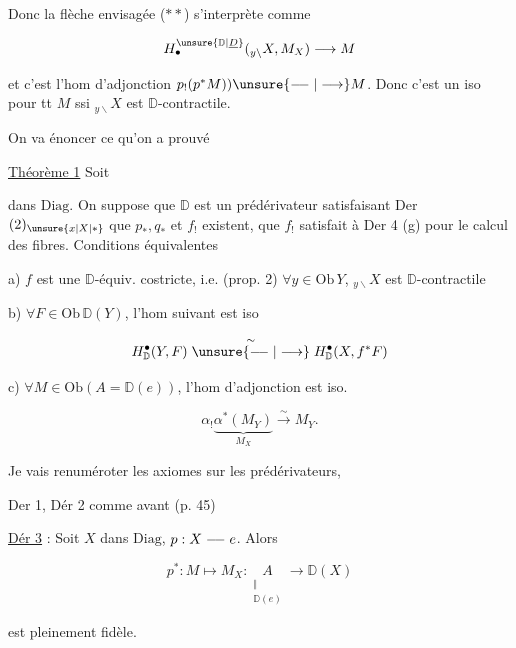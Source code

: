 
Donc la flèche envisagée ($**$) s'interprète comme

\[ H_\bullet^{\unsure{\mathbb D|\underline D}}({}_{y\backslash}X,M_X)\longrightarrow M \]

et c'est l'hom d'adjonction $p_!(p^*M))\unsure{\relbar\joinrel\relbar|\longrightarrow}M$. Donc c'est un iso pour tt $M$ ssi $ {}_{y\backslash}X$ est  $\mathbb D$-contractile.

On va  énoncer ce qu'on a prouvé

\uline{Théorème 1} Soit


dans $\mathrm{Diag}$. On suppose que $\mathbb D$ est un  prédérivateur satisfaisant Der $(2)_{\unsure{x|X|*}}$  que  $p_*,q_*$ et $f_!$ existent, que $f_!$ satisfait à Der 4 (g) pour le calcul des fibres. Conditions équivalentes

a) $f$ est une $\mathbb D$-équiv. costricte, i.e. (prop. 2) $\forall y\in\mathrm{Ob}\,Y$, $ {}_{y\backslash}X$ est $\mathbb D$-contractile

b) $\forall F\in\mathrm{Ob}\,\mathbb D(Y)$, l'hom suivant est iso

\[ H^\bullet_{\mathbb D}(Y,F)\mathrel{\overset{\sim}{\unsure{\relbar\joinrel\relbar|\longrightarrow}}}H^\bullet_{\mathbb D}(X,f^*F) \]

c) $\forall M\in\mathrm{Ob}(A=\mathbb D(e))$, l'hom d'adjonction est iso.

\[ \alpha_!\underbrace{\alpha^*(M_Y)}_{M_X}\xrightarrow{\sim}M_Y. \]

Je vais renuméroter les  axiomes sur les prédérivateurs,

Der 1, Dér 2 comme avant (p. 45)


\uline{Dér 3} : Soit $X$ dans $\mathrm{Diag}$, $p:X\mathrel{\relbar\joinrel\relbar}e$.  Alors

\[ p^*:M\longmapsto M_X:\underset{\substack{\Vert\\\mathbb D(e)}}{A}\longrightarrow\mathbb D(X) \]

est pleinement fidèle.



